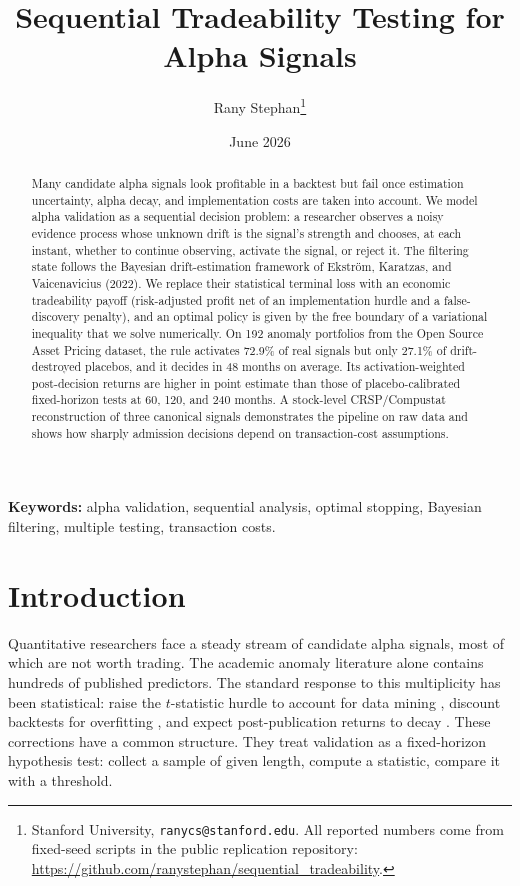 \documentclass[11pt]{article}
\title{Sequential Tradeability Testing for Alpha Signals}
\author{Rany Stephan\thanks{Stanford University, \texttt{ranycs@stanford.edu}.  All
reported numbers come from fixed-seed scripts in the public replication repository:
\url{https://github.com/ranystephan/sequential_tradeability}.}}
\date{June 2026}
\begin{document}
\maketitle

\begin{abstract}
\noindent
Many candidate alpha signals look profitable in a backtest but fail once estimation
uncertainty, alpha decay, and implementation costs are taken into account.  We model
alpha validation as a sequential decision problem: a researcher observes a noisy
evidence process whose unknown drift is the signal's strength and chooses, at each
instant, whether to continue observing, activate the signal, or reject it.  The
filtering state follows the Bayesian drift-estimation framework of Ekstr\"om, Karatzas,
and Vaicenavicius (2022).  We replace their statistical terminal loss with an
economic tradeability payoff (risk-adjusted profit net of an implementation hurdle and
a false-discovery penalty), and an optimal policy is given by the free boundary of a
variational inequality that we solve numerically.  On 192 anomaly portfolios from the
Open Source Asset Pricing dataset, the rule activates 72.9\% of real signals but only
27.1\% of drift-destroyed placebos, and it decides in 48 months on average.  Its
activation-weighted post-decision returns are higher in point estimate than those of
placebo-calibrated fixed-horizon tests at 60, 120, and 240 months.  A stock-level
CRSP/Compustat reconstruction of three canonical signals demonstrates the pipeline on
raw data and shows how sharply admission decisions depend on transaction-cost
assumptions.
\end{abstract}

\medskip
\noindent\textbf{Keywords:} alpha validation, sequential analysis, optimal stopping,
Bayesian filtering, multiple testing, transaction costs.

\section{Introduction}

Quantitative researchers face a steady stream of candidate alpha signals, most of
which are not worth trading.  The academic anomaly literature alone contains hundreds
of published predictors.  The standard response to this multiplicity has been
statistical: raise the $t$-statistic hurdle to account for data mining
\citep{harveyLiuZhu2016}, discount backtests for overfitting
\citep{baileyBorweinLopezdePradoZhu2017}, and expect post-publication returns to decay
\citep{mcleanPontiff2016}.  These corrections have a common structure.  They treat
validation as a fixed-horizon hypothesis test: collect a sample of given length,
compute a statistic, compare it with a threshold.
\end{document}
